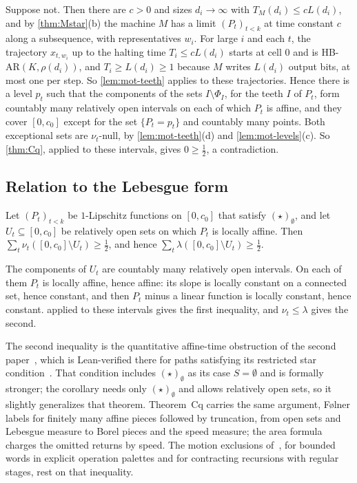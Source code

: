 \begin{informalproof}
Suppose not. Then there are $c>0$ and sizes $d_i\to\infty$ with $T_M(d_i)\le cL(d_i)$, and by \cref{thm:Mstar}(b) the
machine $M$ has a limit $(P_t)_{t<k}$ at time constant $c$ along a subsequence, with representatives $w_i$. For large
$i$ and each $t$, the trajectory $x_{t,w_i}$ up to the halting time $T_i\le cL(d_i)$ starts at cell $0$ and is
HB-AR$(K,\rho(d_i))$, and $T_i\ge L(d_i)\ge1$ because $M$ writes $L(d_i)$ output bits, at most one per step. So
\cref{lem:mot-teeth} applies to these trajectories. Hence there is a level $p_t$ such that the components of
the sets $I\setminus\Phi_I$, for the teeth $I$ of $P_t$, form countably many relatively open intervals on each of which
$P_t$ is affine, and they cover $[0,c_0]$ except for the set $\{P_t=p_t\}$ and countably many points. Both exceptional
sets are $\nu_t$-null, by \cref{lem:mot-teeth}(d) and \cref{lem:mot-levels}(c). So \cref{thm:Cq}, applied to these
intervals, gives $0\ge\frac12$, a contradiction.
\end{informalproof}

\subsection{Relation to the Lebesgue form}\label{sec:mot-lambda}

\begin{corollary}\label{cor:mot-lambda}
\notformalized
Let $(P_t)_{t<k}$ be $1$-Lipschitz functions on $[0,c_0]$ that satisfy $(\star)_\emptyset$, and let
$U_t\subseteq[0,c_0]$ be relatively open sets on which $P_t$ is locally affine. Then
$\sum_t\nu_t([0,c_0]\setminus U_t)\ge\frac12$, and hence $\sum_t\lambda([0,c_0]\setminus U_t)\ge\frac12$.
\end{corollary}

\begin{informalproof}
The components of $U_t$ are countably many relatively open intervals. On each of them $P_t$ is locally affine, hence
affine: its slope is locally constant on a connected set, hence constant, and then $P_t$ minus a linear function is
locally constant, hence constant.  applied to these intervals gives the first inequality, and
$\nu_t\le\lambda$ gives the second.
\end{informalproof}

The second inequality is the quantitative affine-time obstruction of the second paper~\cite[Theorem~6.2]{SecondPaper2026},
which is Lean-verified there for paths satisfying its restricted star condition~\cite[Definition~6.1]{SecondPaper2026}.
That condition includes $(\star)_\emptyset$ as its case $S=\emptyset$ and is formally stronger; the corollary needs only
$(\star)_\emptyset$ and allows relatively open sets, so it slightly generalizes that theorem. Theorem~Cq carries the same
argument, F\o lner labels for finitely many affine pieces followed by truncation, from open sets and Lebesgue measure to
Borel pieces and the speed measure; the area formula charges the omitted returns by speed. The motion exclusions of~\cite[Sections~6 and~7]{SecondPaper2026}, for bounded words in explicit
operation palettes and for contracting recursions with regular stages, rest on that inequality.

